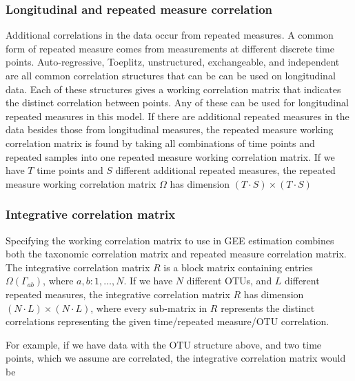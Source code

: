 \documentclass[12pt]{article}
\begin{document}
\subsubsection{Longitudinal and repeated measure correlation}
Additional correlations in the data occur from repeated measures. A common form of repeated measure comes from measurements at different discrete time points. Auto-regressive, Toeplitz, unstructured, exchangeable, and independent are all common correlation structures that can be can be used on longitudinal data. Each of these structures gives a working correlation matrix that indicates the distinct correlation between points. Any of these can be used for longitudinal repeated measures in this model. If there are additional repeated measures in the data besides those from longitudinal measures, the repeated measure working correlation matrix is found by taking all combinations of time points and repeated samples into one repeated measure working correlation matrix. If we have $T$ time points and $S$ different additional repeated measures, the repeated measure working correlation matrix $\Omega$ has dimension $(T \cdot S) \times (T \cdot S ) $

\subsubsection{Integrative correlation matrix }

Specifying the working correlation matrix to use in GEE estimation combines both the taxonomic correlation matrix and repeated measure correlation matrix. The integrative correlation matrix $R$ is a block matrix containing entries $\Omega(\Gamma_{ab})$, where $a,b: 1, \ldots , N$. If we have $N$ different OTUs, and $L$ different repeated measures, the integrative correlation matrix $R$ has dimension $(N \cdot L) \times (N \cdot L)$, where every sub-matrix in $R$ represents the distinct correlations representing the given time/repeated measure/OTU correlation.

For example, if we have data with the OTU structure above, and two time points, which we assume are correlated, the integrative correlation matrix would be
\end{document}
